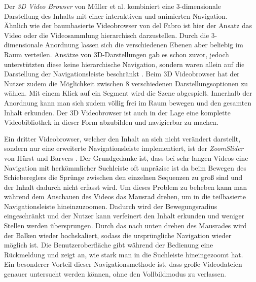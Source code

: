\documentclass[11pt,a4paper]{report}
\begin{document}
Der \emph{3D Video Browser} von Müller et al. \cite{muller2012demonstration} kombiniert eine 3-dimensionale Darstellung des Inhalts mit einer interaktiven und animierten Navigation. Ähnlich wie der baumbasierte Videobrowser von del Fabro \cite{del2010instant} ist hier der Ansatz das Video oder die Videosammlung hierarchisch darzustellen. Durch die 3-dimensionale Anordnung lassen sich die verschiedenen Ebenen aber beliebig im Raum verteilen. Ansätze von 3D-Darstellungen gab es schon zuvor, jedoch unterstützten diese keine hierarchische Navigation, sondern waren allein auf die Darstellung der Navigationsleiste beschränkt \cite{divakaran2005augmenting}. Beim 3D Videobrowser hat der Nutzer zudem die Möglichkeit zwischen 8 verschiedenen Darstellungsoptionen zu wählen. Mit einem Klick auf ein Segment wird die Szene abgespielt. Innerhalb der Anordnung kann man sich zudem völlig frei im Raum bewegen und den gesamten Inhalt erkunden. Der 3D Videobrowser ist auch in der Lage eine komplette Videobibliothek in dieser Form abzubilden und navigierbar zu machen. \cite{muller2012demonstration}

Ein dritter Videobrowser, welcher den Inhalt an sich nicht verändert darstellt, sondern nur eine erweiterte Navigationsleiste implementiert, ist der \emph{ZoomSlider} von Hürst und Barvers \cite{hurst2005interactive}. Der Grundgedanke ist, dass bei sehr langen Videos eine Navigation mit herkömmlicher Suchleiste oft unpräzise ist da beim Bewegen des Schiebereglers die Sprünge zwischen den einzelnen Sequenzen zu groß sind und der Inhalt dadurch nicht erfasst wird. Um dieses Problem zu beheben kann man während dem Anschauen des Videos das Mausrad drehen, um in die teilbasierte Navigationsleiste hineinzuzoomen. Dadurch wird der Bewegungsradius eingeschränkt und der Nutzer kann verfeinert den Inhalt erkunden und weniger Stellen werden übersprungen. Durch das nach unten drehen des Mausrades wird der Balken wieder hochskaliert, sodass die ursprüngliche Navigation wieder möglich ist. Die Benutzeroberfläche gibt während der Bedienung eine Rückmeldung und zeigt an, wie stark man in die Suchleiste hineingezoomt hat. Ein besonderer Vorteil dieser Navigationsmethode ist, dass große Videodateien genauer untersucht werden können, ohne den Vollbildmodus zu verlassen.
\end{document}
